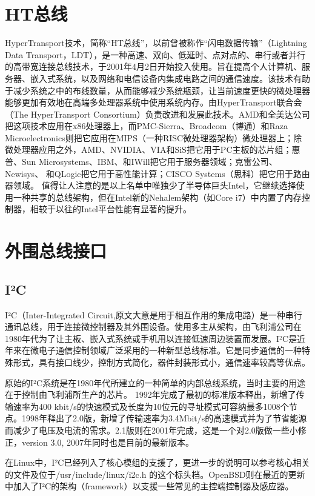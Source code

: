 \section{HT总线}
HyperTransport技术，简称“HT总线”，以前曾被称作“闪电数据传输”（Lightning Data Transport，LDT），是一种高速、双向、低延时、点对点的、串行或者并行的高带宽连接总线技术，于2001年4月2日开始投入使用。旨在提高个人计算机、服务器、嵌入式系统，以及网络和电信设备内集成电路之间的通信速度。该技术有助于减少系统之中的布线数量，从而能够减少系统瓶颈，让当前速度更快的微处理器能够更加有效地在高端多处理器系统中使用系统内存。由HyperTransport联合会（The HyperTransport Consortium）负责改进和发展此技术。AMD和全美达公司把这项技术应用在x86处理器上，而PMC-Sierra、Broadcom（博通）和Raza Microelectronics则把它应用在MIPS（一种RISC微处理器架构）微处理器上；除微处理器应用之外，AMD、NVIDIA、VIA和SiS把它用于PC主板的芯片组；惠普、Sun Microsystems、IBM、和IWill把它用于服务器领域；克雷公司、Newisys、 和QLogic把它用于高性能计算；CISCO Systems（思科）把它用于路由器领域。 值得让人注意的是以上名单中唯独少了半导体巨头Intel，它继续选择使用一种共享的总线架构，但在Intel新的Nehalem架构（如Core i7）中内置了内存控制器，相较于以往的Intel平台性能有显著的提升。 

\section{外围总线接口} 


\subsection{I²C}
I²C（Inter-Integrated Circuit,原文大意是用于相互作用的集成电路）是一种串行通讯总线，用于连接微控制器及其外围设备。使用多主从架构，由飞利浦公司在1980年代为了让主板、嵌入式系统或手机用以连接低速周边装置而发展。I²C是近年来在微电子通信控制领域广泛采用的一种新型总线标准。它是同步通信的一种特殊形式，具有接口线少，控制方式简化，器件封装形式小，通信速率较高等优点。

原始的I²C系统是在1980年代所建立的一种简单的内部总线系统，当时主要的用途在于控制由飞利浦所生产的芯片。
1992年完成了最初的标准版本释出，新增了传输速率为400 kbit/s的快速模式及长度为10位元的寻址模式可容纳最多1008个节点。1998年释出了2.0版，新增了传输速率为3.4Mbit/s的高速模式并为了节省能源而减少了电压及电流的需求。2.1版则在2001年完成，这是一个对2.0版做一些小修正，version 3.0, 2007年同时也是目前的最新版本。

在Linux中，I²C已经列入了核心模组的支援了，更进一步的说明可以参考核心相关的文件及位于/usr/include/linux/i2c.h 的这个标头档。OpenBSD则在最近的更新中加入了I²C的架构（framework）以支援一些常见的主控端控制器及感应器。

